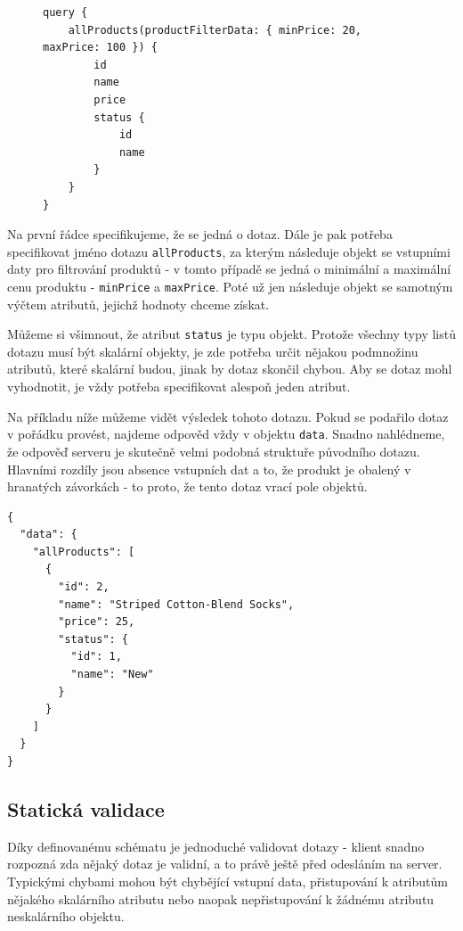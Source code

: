 \documentclass[thesis=M,czech]{FITthesis}[2019/12/23]
\begin{document}
\begin{figure}[h]
\begin{verbatim}
query {
    allProducts(productFilterData: { minPrice: 20, maxPrice: 100 }) {
        id
        name
        price
        status {
            id
            name
        }
    }
}
\end{verbatim}
\end{figure}

Na první řádce specifikujeme, že se jedná o dotaz. Dále je pak potřeba specifikovat jméno dotazu \texttt{allProducts}, za kterým následuje objekt se vstupními daty pro filtrování produktů - v tomto případě se jedná o minimální a maximální cenu produktu - \texttt{minPrice} a \texttt{maxPrice}. Poté už jen následuje objekt se samotným výčtem atributů, jejichž hodnoty chceme získat.

Můžeme si všimnout, že atribut \texttt{status} je typu objekt. Protože všechny typy listů dotazu musí být skalární objekty, je zde potřeba určit nějakou podmnožinu atributů, které skalární budou, jinak by dotaz skončil chybou. Aby se dotaz mohl vyhodnotit, je vždy potřeba specifikovat alespoň jeden atribut.

Na příkladu níže můžeme vidět výsledek tohoto dotazu. Pokud se podařilo dotaz v pořádku provést, najdeme odpověd vždy v objektu \texttt{data}. Snadno nahlédneme, že odpověď serveru je skutečně velmi podobná struktuře původního dotazu. Hlavními rozdíly jsou absence vstupních dat a to, že produkt je obalený v hranatých závorkách - to proto, že tento dotaz vrací pole objektů.

\begin{verbatim}
{
  "data": {
    "allProducts": [
      {
        "id": 2,
        "name": "Striped Cotton-Blend Socks",
        "price": 25,
        "status": {
          "id": 1,
          "name": "New"
        }
      }
    ]
  }
}  
\end{verbatim}

\subsection{Statická validace}
Díky definovanému schématu je jednoduché validovat dotazy - klient snadno rozpozná zda nějaký dotaz je validní, a to právě ještě před odesláním na server. Typickými chybami mohou být chybějící vstupní data, přistupování k atributům nějakého skalárního atributu nebo naopak nepřistupování k žádnému atributu neskalárního objektu.
\end{document}
